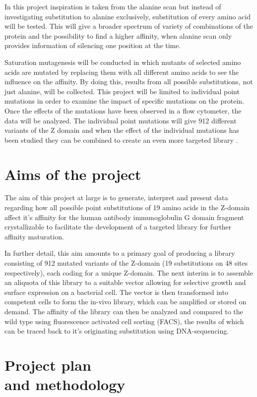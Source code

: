 \documentclass{article}
\begin{document}
\begin{multicols}{2}
	In this project inspiration is taken from the alanine scan but instead of investigating substitution to alanine exclusively, substitution of every amino acid will be tested. This will give a broader spectrum of variety of combinations of the protein and the possibility to find a higher affinity, when alanine scan only provides information of silencing one position at the time.
	
	Saturation mutagenesis will be conducted in which mutants of selected amino acids are mutated by replacing them with all different amino acids to see the influence on the affinity. By doing this, results from all possible substitutions, not just alanine, will be collected. This project will be limited to individual point mutations in order to examine the impact of specific mutations on the protein. Once the effects of the mutations have been observed in a flow cytometer, the data will be analyzed. The individual point mutations will give 912 different variants of the Z domain and when the effect of the individual mutations has been studied they can be combined to create an even more targeted library \cite{john}.
	
	\section{Aims of the project}
	The aim of this project at large is to generate, interpret and present data regarding how all possible point substitutions of 19 amino acids in the Z-domain affect it’s affinity for the human antibody immunoglobulin G domain fragment crystallizable to facilitate the development of a targeted library for further affinity maturation.
	
	In further detail, this aim amounts to a primary goal of producing a library consisting of 912 mutated variants of the Z-domain (19 substitutions on 48  sites respectively), each coding for a unique Z-domain. The next interim is to assemble an aliquota of this library to a suitable vector allowing for selective growth and surface expression on a bacterial cell. The vector is then transformed into competent cells to form the in-vivo library, which can be amplified or stored on demand. The affinity of the library can then be analyzed and compared to the wild type using fluorescence activated cell sorting (FACS), the results of which can be traced back to it’s originating substitution using DNA-sequencing.
	
	\section{Project plan \\ and methodology}

\end{multicols}
\end{document}
